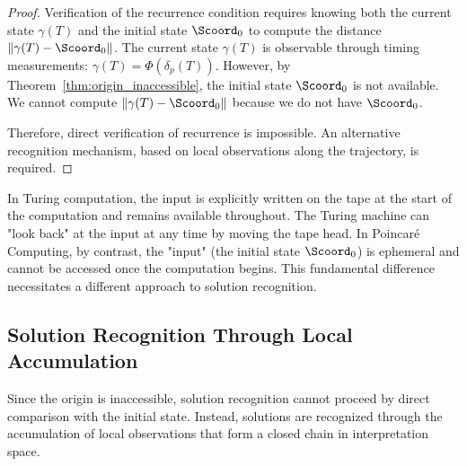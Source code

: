 \begin{proof}
Verification of the recurrence condition requires knowing both the current state $\gamma(T)$ and the initial state $\Scoord_0$ to compute the distance $\|\gamma(T) - \Scoord_0\|$. The current state $\gamma(T)$ is observable through timing measurements: $\gamma(T) = \Phi(\delta_p(T))$. However, by Theorem~\ref{thm:origin_inaccessible}, the initial state $\Scoord_0$ is not available. We cannot compute $\|\gamma(T) - \Scoord_0\|$ because we do not have $\Scoord_0$.

Therefore, direct verification of recurrence is impossible. An alternative recognition mechanism, based on local observations along the trajectory, is required.
\end{proof}

\begin{remark}
\label{rem:turing_input}
In Turing computation, the input is explicitly written on the tape at the start of the computation and remains available throughout. The Turing machine can "look back" at the input at any time by moving the tape head. In Poincaré Computing, by contrast, the "input" (the initial state $\Scoord_0$) is ephemeral and cannot be accessed once the computation begins. This fundamental difference necessitates a different approach to solution recognition.
\end{remark}

\subsection{Solution Recognition Through Local Accumulation}

Since the origin is inaccessible, solution recognition cannot proceed by direct comparison with the initial state. Instead, solutions are recognized through the accumulation of local observations that form a closed chain in interpretation space.

